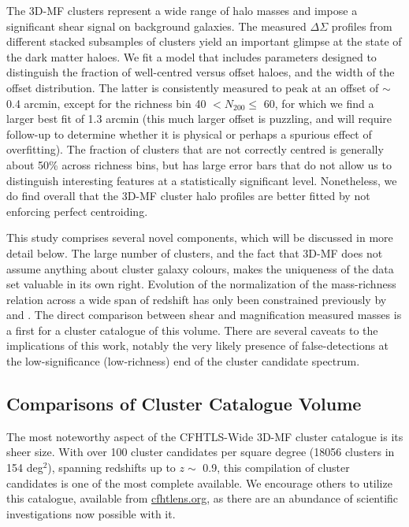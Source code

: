 The \ac{3D-MF} clusters represent a wide range of halo masses and impose a significant shear signal on background galaxies. The measured $\Delta \Sigma$ profiles from different stacked subsamples of clusters yield an important glimpse at the state of the dark matter haloes. We fit a model that includes parameters designed to distinguish the fraction of well-centred versus offset haloes, and the width of the offset distribution. The latter is consistently measured to peak at an offset of $\sim$ 0.4 arcmin, except for the richness bin 40 $< N_{200} \leq$ 60, for which we find a larger best fit of 1.3 arcmin (this much larger offset is puzzling, and will require follow-up to determine whether it is physical or perhaps a spurious effect of overfitting). The fraction of clusters that are not correctly centred is generally about 50\% across richness bins, but has large error bars that do not allow us to distinguish interesting features at a statistically significant level. Nonetheless, we do find overall that the \ac{3D-MF} cluster halo profiles are better fitted by not enforcing perfect centroiding.

This study comprises several novel components, which will be discussed in more detail below. The large number of clusters, and the fact that \ac{3D-MF} does not assume anything about cluster galaxy colours, makes the uniqueness of the data set valuable in its own right.  Evolution of the normalization of the mass-richness relation across a wide span of redshift has only been constrained previously by \citet{EdoThesis12} and \citet{Andreon14}. The direct comparison between shear and magnification measured masses is a first for a cluster catalogue of this volume. There are several caveats to the implications of this work, notably the very likely presence of false-detections at the low-significance (low-richness) end of the cluster candidate spectrum.



\subsection{Comparisons of Cluster Catalogue Volume}

The most noteworthy aspect of the \ac{CFHTLS}-Wide \ac{3D-MF} cluster catalogue is its sheer size. With over 100 cluster candidates per square degree (18056 clusters in 154 deg$^2$), spanning redshifts up to $z \sim$ 0.9, this compilation of cluster candidates is one of the most complete available. We encourage others to utilize this catalogue, available from \url{cfhtlens.org}, as there are an abundance of scientific investigations now possible with it. 

